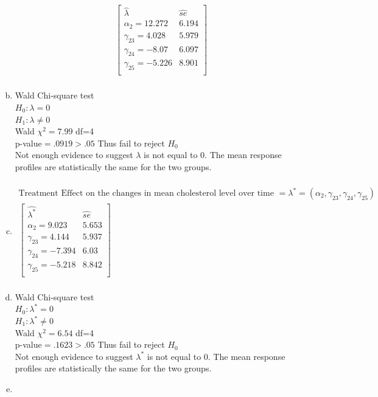 \documentclass{article}
\begin{document}
\begin{flushleft}
\begin{enumerate}[(a)]
\begin{multline*}
\left[\begin{array}{c|c}
\hat{\lambda}&\hat{se}\\
\hline
\alpha_2=12.272 &6.194\\
\gamma_{23}=4.028&5.979\\
\gamma_{24}=-8.07&6.097\\
\gamma_{25}=-5.226&8.901\\
\end{array}\right]\\
\end{multline*}
\item
	Wald Chi-square test\\
$H_0:\lambda=0$\\
$H_1:\lambda \neq 0$\\
Wald $\chi^2=7.99$ df=4\\
p-value$=.0919>.05$ Thus fail to reject $H_0$\\
Not enough evidence to suggest $\lambda$ is not equal to 0. The mean response profiles are statistically the same for the two groups.\\
\item
\begin{multline*}\\
\text{Treatment Effect on the changes in mean cholesterol level over time }=\lambda^*=(\alpha_2,\gamma_{23},\gamma_{24},\gamma_{25})\\
\left[\begin{array}{c|c}
\hat{\lambda^*}&\hat{se}\\
\hline
\alpha_2=9.023 & 5.653\\
\gamma_{23}=4.144& 5.937\\
\gamma_{24}=-7.394&6.03\\
\gamma_{25}=-5.218&8.842\\
\end{array}\right]\\
\end{multline*}
\item
	Wald Chi-square test\\
$H_0:\lambda^*=0$\\
$H_1:\lambda^* \neq 0$\\
Wald $\chi^2=6.54$ df=4\\
p-value$=.1623>.05$ Thus fail to reject $H_0$\\
Not enough evidence to suggest $\lambda^*$ is not equal to 0. The mean response profiles are statistically the same for the two groups.\\
\item

\end{enumerate}
\end{flushleft}
\end{document}
